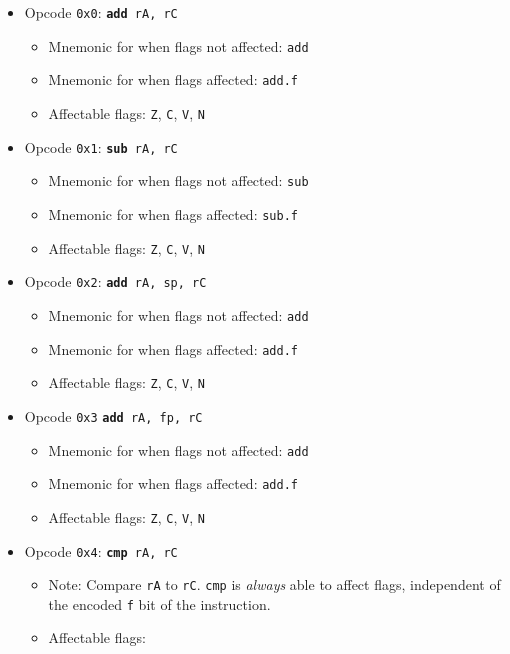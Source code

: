\documentclass{article}
\begin{document}
	\singlespacing
	\begin{itemize}
		\item Opcode \texttt{0x0}:
			\texttt{\textbf{add} rA, rC}
		\begin{itemize}
			\item Mnemonic for when flags not affected:  \texttt{add}
			\item Mnemonic for when flags affected:  \texttt{add.f}
			\item Affectable flags:
				\texttt{Z}, \texttt{C}, \texttt{V}, \texttt{N}
		\end{itemize}
		\item Opcode \texttt{0x1}:
			\texttt{\textbf{sub} rA, rC}
		\begin{itemize}
			\item Mnemonic for when flags not affected:  \texttt{sub}
			\item Mnemonic for when flags affected:  \texttt{sub.f}
			\item Affectable flags:
				\texttt{Z}, \texttt{C}, \texttt{V}, \texttt{N}
		\end{itemize}
		\item Opcode \texttt{0x2}:
			\texttt{\textbf{add} rA, sp, rC}
		\begin{itemize}
			\item Mnemonic for when flags not affected:  \texttt{add}
			\item Mnemonic for when flags affected:  \texttt{add.f}
			\item Affectable flags:
				\texttt{Z}, \texttt{C}, \texttt{V}, \texttt{N}
		\end{itemize}
		\item Opcode \texttt{0x3}
			\texttt{\textbf{add} rA, fp, rC}
		\begin{itemize}
			\item Mnemonic for when flags not affected:  \texttt{add}
			\item Mnemonic for when flags affected:  \texttt{add.f}
			\item Affectable flags:
				\texttt{Z}, \texttt{C}, \texttt{V}, \texttt{N}
		\end{itemize}
		\item Opcode \texttt{0x4}:
			\texttt{\textbf{cmp} rA, rC}
		\begin{itemize}
			\item Note:  Compare \texttt{rA} to \texttt{rC}.  \texttt{cmp}
			is \textit{always} able to affect flags, independent of the
			encoded \texttt{f} bit of the instruction.
			\item Affectable flags:

\end{itemize}
\end{itemize}
\end{document}
